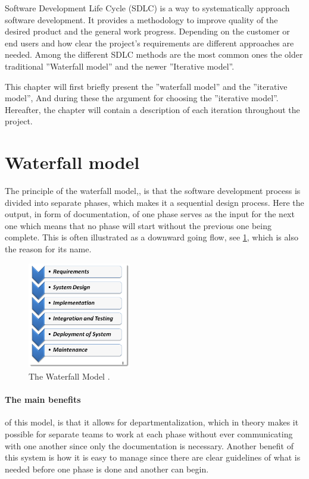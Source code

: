 Software Development Life Cycle (SDLC) is a way to systematically approach software development.
It provides a methodology to improve quality of the desired product and the general work progress. 
Depending on the customer or end users and how clear the project's requirements are different approaches are needed. 
Among the different SDLC methods are the most common ones the older traditional ''Waterfall model'' and the newer ''Iterative model''. \cite{SDLC-Toolsqa}

This chapter will first briefly present the ''waterfall model'' and the ''iterative model'', And during these the argument for choosing the ''iterative model''.
Hereafter, the chapter will contain a description of each iteration throughout the project.


\section{Waterfall model}\label{sec:WaterfallModel}
The principle of the waterfall model,\cite{Waterfall-Toolsqa}, is that the software development process is divided into separate phases, which makes it a sequential design process.
Here the output, in form of documentation, of one phase serves as the input for the next one which means that no phase will start without the previous one being complete.
This is often illustrated as a downward going flow, see \cref{fig:Waterfall}, which is also the reason for its name.

\begin{figure}[H]
	\centering
	\includegraphics[width=0.4\textwidth]{billeder/WaterFall-Model.png}
	\caption{The Waterfall Model \cite{Waterfall-Toolsqa}.}\label{fig:Waterfall}
\end{figure}

\paragraph{The main benefits} of this model, is that it allows for departmentalization, which in theory makes it possible for separate teams to work at each phase without ever communicating with one another since only the documentation is necessary.
Another benefit of this system is how it is easy to manage since there are clear guidelines of what is needed before one phase is done and another can begin.

